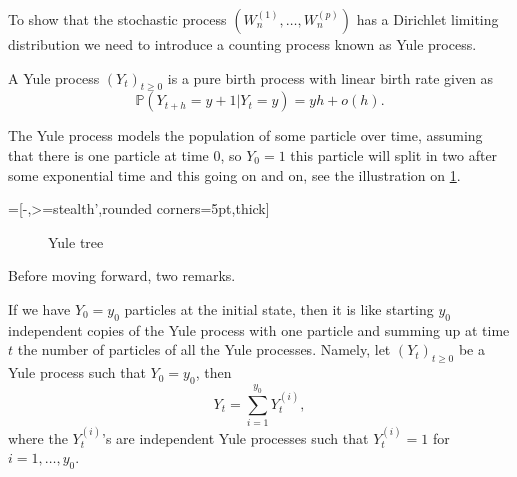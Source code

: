 To show that the stochastic process $(W_n^{(1)},\ldots, W_n^{(p)})$ has a Dirichlet limiting distribution we need to introduce a counting process known as Yule process.
\begin{definition}\label{def:yule_process}
A Yule process $(Y_t)_{t\geq0}$ is a pure birth process with linear birth rate given as 
\[
\mathbb{P}(Y_{t+h} = y+1|Y_{t} =y) = yh+o(h).
\] 
\end{definition}
The Yule process models the population of some particle over time, assuming that there is one particle at time $0$, so $Y_0=1$ this particle will split in two after some exponential time and this going on and on, see the illustration on \cref{fig:yule_tree}. 

=[-,>=stealth',rounded corners=5pt,thick]  
\begin{figure}[!ht]
\begin{center}
\caption{Yule tree}
\label{fig:yule_tree}
\end{center}
\end{figure}
Before moving forward, two remarks.
\begin{remark}\label{rem:yule_process_initial}
If we have $Y_0 = y_0$ particles at the initial state, then it is like starting $y_0$ independent copies of the Yule process with one particle and summing up at time $t$ the number of particles of all the Yule processes. Namely, let $(Y_t)_{t\geq0}$ be a Yule process such that $Y_0 = y_0$, then
$$
Y_t = \sum_{i = 1}^{y_0}Y_t^{(i)},
$$   
where the $Y_t^{(i)}$'s are independent Yule processes such that $Y_t^{(i)}=1$ for $i = 1,\ldots, y_0$.
\end{remark}
